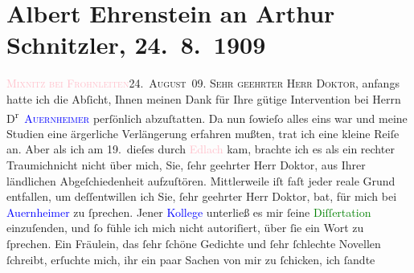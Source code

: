 

               \section[Albert Ehrenstein an Arthur Schnitzler, 24. 8. 1909]{ Albert Ehrenstein an Arthur Schnitzler, 24. 8. 1909}\nopagebreak{}\rehead{ }\normalsize\beginnumbering{} \toendnotes[C]{\smallbreak\pagebreak[2]} 
\toendnotes[C]{\smallbreak}\pstart
           {\pb}\textsc{\textcolor{pink}{Mixnitz bei Frohnleiten}{}\ledrightnote{\textcolor{pink}{Mixnitz}}}\hfill \textsc{24. August 09.}\pend
           \pstart{}\textsc{Sehr geehrter Herr Doktor,}\pend\pstart
           anfangs hatte ich die Abſicht, Ihnen meinen Dank für Ihre gütige Intervention bei
                    Herrn D\textsuperscript{r} \textcolor{blue}{\textsc{Auernheimer}}{}\ledrightnote{\textcolor{blue}{Raoul Auernheimer}} perſönlich abzuſtatten. Da nun ſowieſo alles eins war und meine Studien
                    eine ärgerliche Verlängerung erfahren mußten, trat ich eine kleine Reiſe an.
                    Aber als ich am 19. dieſes durch \textcolor{pink}{Edlach}{}\ledrightnote{\textcolor{pink}{Edlach}} kam, brachte ich es als ein rechter Traumichnicht nicht {\pb}über mich, Sie, ſehr geehrter Herr Doktor, aus Ihrer
                    ländlichen Abgeſchiedenheit aufzuſtören. Mittlerweile iſt faſt jeder reale Grund
                    entfallen, um deſſentwillen ich Sie, ſehr geehrter Herr Doktor, bat, für mich
                    bei \textcolor{blue}{Auernheimer}{}\ledrightnote{\textcolor{blue}{Raoul Auernheimer}} zu ſprechen. Jener \textcolor{blue}{Kollege}{} unterließ es mir
                    ſeine \textcolor{green}{Diſſertation}{}
                    einzuſenden, und ſo fühle ich mich nicht autoriſiert, über ſie ein Wort zu
                    ſprechen. Ein Fräulein,
                    das ſehr ſchöne Gedichte und ſehr ſchlechte Novellen ſchreibt, erſuchte mich,
                    ihr ein paar Sachen von mir {\pb}zu ſchicken, ich ſandte
